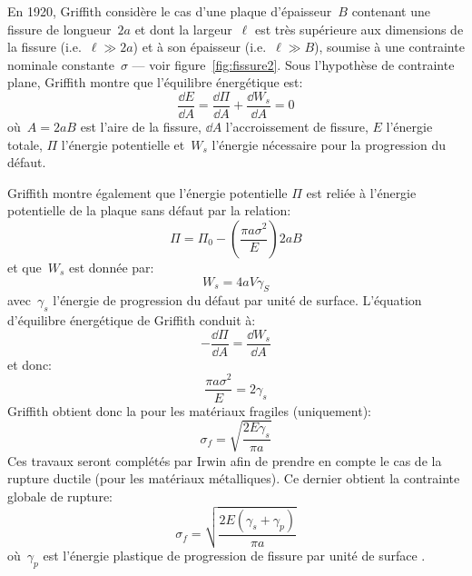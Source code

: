 \medskip
En 1920, Griffith considère le cas d'une plaque d'épaisseur~$B$ contenant une fissure de longueur~$2a$ et dont la largeur~$\ell$ est très supérieure aux dimensions de la fissure (i.e.~$\ell\gg 2a$) et à son épaisseur (i.e.~$\ell\gg B$), soumise à une contrainte nominale constante~$\sigma$ --- voir figure~\ref{fig:fissure2}.
\medskipvm
Sous l'hypothèse de contrainte plane, Griffith montre que l'équilibre énergétique est:
\begin{equation} \frac{\dd E}{\dd A} = \dfrac{\dd\Pi}{\dd A}+\frac{\dd W_s}{\dd A} = 0 \end{equation}
où~$A=2aB$ est l'aire de la fissure, $\dd A$ l'accroissement de fissure, $E$ l'énergie totale, $\Pi$ l'énergie potentielle et~$W_s$ l'énergie nécessaire pour la progression du défaut.

\medskip
Griffith montre également que l'énergie potentielle $\Pi$ est reliée à l'énergie potentielle de la plaque sans défaut par la relation:
\begin{equation} \Pi=\Pi_0 -\left( \dfrac{\pi a \sigma^2}{E} \right) 2aB \end{equation}
et que~$W_s$ est donnée par:
\begin{equation} W_s=4aV\gamma_S\end{equation}
avec~$\gamma_s$ l'énergie de progression du défaut par unité de surface.
L'équation d'équilibre énergétique de Griffith conduit à:
\begin{equation}-\frac{\dd\Pi}{\dd A}=\frac{\dd W_s}{\dd A}\end{equation} et donc:
\begin{equation}\frac{\pi a\sigma^2}{E}=2\gamma_s\end{equation}
\medskipvm
Griffith obtient donc la  pour les matériaux fragiles (uniquement):
\begin{equation} \sigma_f = \sqrt{\dfrac{2E\gamma_s}{\pi a}} \end{equation}
Ces travaux seront complétés par Irwin afin de prendre en compte le cas de la rupture ductile (pour les matériaux métalliques). Ce dernier obtient la contrainte globale de rupture:
\begin{equation} \sigma_f = \sqrt{\dfrac{2E(\gamma_s+\gamma_p)}{\pi a}} \end{equation}
où~$\gamma_p$ est l'énergie plastique de progression de fissure par unité de surface
.


